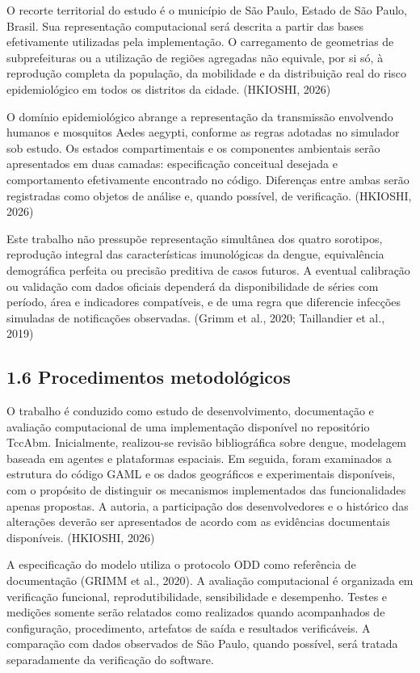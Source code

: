 O recorte territorial do estudo é o município de São Paulo, Estado de
São Paulo, Brasil. Sua representação computacional será descrita a
partir das bases efetivamente utilizadas pela implementação. O
carregamento de geometrias de subprefeituras ou a utilização de regiões
agregadas não equivale, por si só, à reprodução completa da população,
da mobilidade e da distribuição real do risco epidemiológico em todos os
distritos da cidade. (HKIOSHI, 2026)

O domínio epidemiológico abrange a representação da transmissão
envolvendo humanos e mosquitos Aedes aegypti, conforme as regras
adotadas no simulador sob estudo. Os estados compartimentais e os
componentes ambientais serão apresentados em duas camadas: especificação
conceitual desejada e comportamento efetivamente encontrado no código.
Diferenças entre ambas serão registradas como objetos de análise e,
quando possível, de verificação. (HKIOSHI, 2026)

Este trabalho não pressupõe representação simultânea dos quatro
sorotipos, reprodução integral das características imunológicas da
dengue, equivalência demográfica perfeita ou precisão preditiva de casos
futuros. A eventual calibração ou validação com dados oficiais dependerá
da disponibilidade de séries com período, área e indicadores
compatíveis, e de uma regra que diferencie infecções simuladas de
notificações observadas. (Grimm et al., 2020; Taillandier et al., 2019)

\subsection{1.6 Procedimentos
metodológicos}\label{procedimentos-metodoluxf3gicos}

O trabalho é conduzido como estudo de desenvolvimento, documentação e
avaliação computacional de uma implementação disponível no repositório
TccAbm. Inicialmente, realizou-se revisão bibliográfica sobre dengue,
modelagem baseada em agentes e plataformas espaciais. Em seguida, foram
examinados a estrutura do código GAML e os dados geográficos e
experimentais disponíveis, com o propósito de distinguir os mecanismos
implementados das funcionalidades apenas propostas. A autoria, a
participação dos desenvolvedores e o histórico das alterações deverão
ser apresentados de acordo com as evidências documentais disponíveis.
(HKIOSHI, 2026)

A especificação do modelo utiliza o protocolo ODD como referência de
documentação (GRIMM et al., 2020). A avaliação computacional é
organizada em verificação funcional, reprodutibilidade, sensibilidade e
desempenho. Testes e medições somente serão relatados como realizados
quando acompanhados de configuração, procedimento, artefatos de saída e
resultados verificáveis. A comparação com dados observados de São Paulo,
quando possível, será tratada separadamente da verificação do software.

